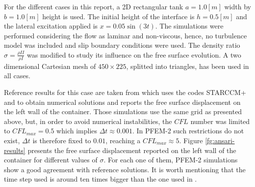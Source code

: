 For the different cases in this report, a 2D rectangular tank $a=1.0[m]$ width by $b=1.0[m]$ height is used. The initial height of the interface is $h=0.5[m]$ and the lateral excitation applied is $x=0.05\sin(3t)$. The simulations were performed considering the flow as laminar and non-viscous, hence, no turbulence model was included and slip boundary conditions were used. The density ratio $\sigma=\frac{\rho{II}}{\rho{I}}$ was modified to study its influence on the free surface evolution. A two dimensional Cartesian mesh of $450\times225$, splitted into triangles, has been used in all cases.

Reference results for this case are taken from \cite{Goni13} which uses the codes STARCCM+ and \OF to obtain numerical solutions and reports the free surface displacement on the left wall of the container. Those simulations use the same grid as presented above, but, in order to avoid numerical instabilities, the $CFL$ number was limited to $CFL_{max}=0.5$ which implies $\Delta t \approx 0.001$. In PFEM-2 such restrictions do not exist, $\Delta t$ is therefore fixed to $0.01$, reaching a $CFL_{max}\approx5$.
Figure \ref{fg:ansari-results} presents the free surface displacement reported on the left wall of the container for different values of $\sigma$. For each one of them, PFEM-2 simulations show a good agreement with reference solutions. It is worth mentioning that the time step used is around ten times bigger than the one used in \cite{Goni13}.


